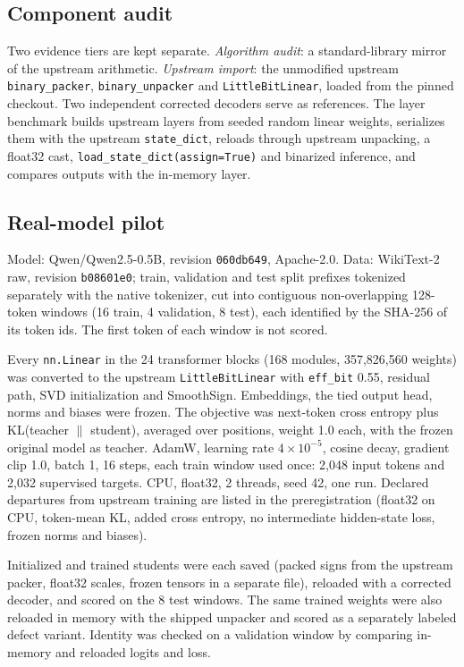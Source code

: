 \documentclass[11pt]{article}
\begin{document}
\subsection{Component audit}
Two evidence tiers are kept separate. \emph{Algorithm audit}: a standard-library mirror of the
upstream arithmetic. \emph{Upstream import}: the unmodified upstream \texttt{binary\_packer},
\texttt{binary\_unpacker} and \texttt{LittleBitLinear}, loaded from the pinned checkout. Two
independent corrected decoders serve as references. The layer benchmark builds upstream layers
from seeded random linear weights, serializes them with the upstream \texttt{state\_dict},
reloads through upstream unpacking, a float32 cast, \texttt{load\_state\_dict(assign=True)} and
binarized inference, and compares outputs with the in-memory layer.

\subsection{Real-model pilot}
Model: Qwen/Qwen2.5-0.5B, revision \texttt{060db649}, Apache-2.0. Data: WikiText-2 raw, revision
\texttt{b08601e0}; train, validation and test split prefixes tokenized separately with the native
tokenizer, cut into contiguous non-overlapping 128-token windows (16 train, 4 validation, 8
test), each identified by the SHA-256 of its token ids. The first token of each window is not
scored.

Every \texttt{nn.Linear} in the 24 transformer blocks (168 modules, 357{,}826{,}560 weights) was
converted to the upstream \texttt{LittleBitLinear} with \texttt{eff\_bit} 0.55, residual path,
SVD initialization and SmoothSign. Embeddings, the tied output head, norms and biases were
frozen. The objective was next-token cross entropy plus KL(teacher $\|$ student), averaged over
positions, weight 1.0 each, with the frozen original model as teacher. AdamW, learning rate
$4\times10^{-5}$, cosine decay, gradient clip 1.0, batch 1, 16 steps, each train window used once:
2{,}048 input tokens and 2{,}032 supervised targets. CPU, float32, 2 threads, seed 42, one run.
Declared departures from upstream training are listed in the preregistration (float32 on CPU,
token-mean KL, added cross entropy, no intermediate hidden-state loss, frozen norms and biases).

Initialized and trained students were each saved (packed signs from the upstream packer, float32
scales, frozen tensors in a separate file), reloaded with a corrected decoder, and scored on the 8
test windows. The same trained weights were also reloaded in memory with the shipped unpacker and
scored as a separately labeled defect variant. Identity was checked on a validation window by
comparing in-memory and reloaded logits and loss.
\end{document}
